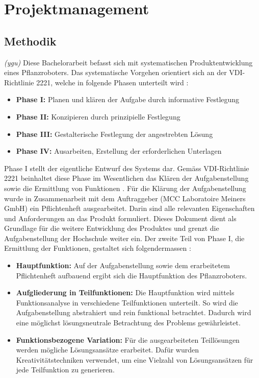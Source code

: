\newpage
\section{Projektmanagement}
\subsection{Methodik}
\label{methodik}
\textit{(ygu)} Diese Bachelorarbeit befasst sich mit systematischen Produktentwicklung eines Pflanzroboters. Das systematische Vorgehen orientiert sich  an der VDI-Richtlinie 2221, welche in folgende Phasen unterteilt wird \cite{naefe}:

\begin{itemize}
	\item \textbf{Phase I:} Planen und klären der Aufgabe durch informative Festlegung
	
	\item \textbf{Phase II:} Konzipieren durch prinzipielle Festlegung
	
	\item \textbf{Phase III:} Gestalterische Festlegung der angestrebten Lösung
	
	\item \textbf{Phase IV:} Ausarbeiten, Erstellung der erforderlichen Unterlagen
	
\end{itemize}

Phase I stellt der eigentliche Entwurf des Systems dar. Gemäss VDI-Richtlinie 2221 beinhaltet diese Phase im Wesentlichen das Klären der Aufgabenstellung sowie die Ermittlung von Funktionen \cite{vdi2221}. Für die Klärung der Aufgabenstellung wurde in Zusammenarbeit mit dem Auftraggeber (MCC Laboratoire Meiners GmbH) ein Pflichtenheft ausgearbeitet. Darin sind alle relevanten Eigenschaften und Anforderungen an das Produkt formuliert. Dieses Dokument dient als Grundlage für die weitere Entwicklung des Produktes und grenzt die Aufgabenstellung der Hochschule weiter ein. Der zweite Teil von Phase I, die Ermittlung der Funktionen, gestaltet sich folgendermassen \cite{pahl}:

\begin{itemize}
	\item \textbf{Hauptfunktion:} Auf der Aufgabenstellung sowie dem erarbeitetem Pflichtenheft aufbauend ergibt sich die Hauptfunktion des Pflanzroboters.
	
	\item \textbf{Aufgliederung in Teilfunktionen:} Die Hauptfunktion wird mittels Funktionsanalyse in verschiedene Teilfunktionen unterteilt. So wird die Aufgabenstellung abstrahiert und rein funktional betrachtet. Dadurch wird eine möglichst lösungsneutrale Betrachtung des Problems gewährleistet. 
	
	\item \textbf{Funktionsbezogene Variation:} Für die ausgearbeiteten Teillösungen werden mögliche Lösungsansätze erarbeitet. Dafür wurden Kreativitätstechniken verwendet, um eine Vielzahl von Lösungsansätzen für jede Teilfunktion zu generieren.

\end{itemize}

